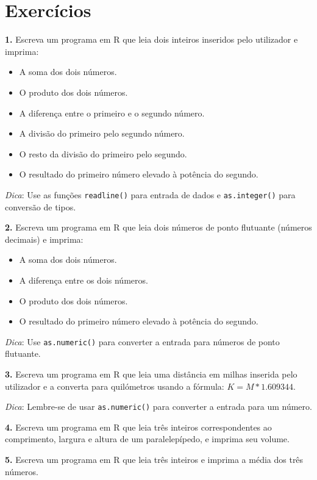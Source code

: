 \documentclass[
]{book}
\providecommand{\tightlist}{%
  \setlength{\itemsep}{0pt}\setlength{\parskip}{0pt}}
\begin{document}
\section{Exercícios}\label{exercuxedcios}

\textbf{1.} Escreva um programa em R que leia dois inteiros inseridos pelo
utilizador e imprima:

\begin{itemize}
\tightlist
\item
  A soma dos dois números.
\item
  O produto dos dois números.
\item
  A diferença entre o primeiro e o segundo número.
\item
  A divisão do primeiro pelo segundo número.
\item
  O resto da divisão do primeiro pelo segundo.
\item
  O resultado do primeiro número elevado à potência do segundo.
\end{itemize}

\emph{Dica}: Use as funções \texttt{readline()} para entrada de dados e
\texttt{as.integer()} para conversão de tipos.

\textbf{2.} Escreva um programa em R que leia dois números de ponto flutuante
(números decimais) e imprima:

\begin{itemize}
\tightlist
\item
  A soma dos dois números.
\item
  A diferença entre os dois números.
\item
  O produto dos dois números.
\item
  O resultado do primeiro número elevado à potência do segundo.
\end{itemize}

\emph{Dica}: Use \texttt{as.numeric()} para converter a entrada para números de
ponto flutuante.

\textbf{3.} Escreva um programa em R que leia uma distância em milhas
inserida pelo utilizador e a converta para quilómetros usando a fórmula:
\(K = M*1.609344\).

\emph{Dica}: Lembre-se de usar \texttt{as.numeric()} para converter a entrada para
um número.

\textbf{4.} Escreva um programa em R que leia três inteiros correspondentes
ao comprimento, largura e altura de um paralelepípedo, e imprima seu
volume.

\textbf{5.} Escreva um programa em R que leia três inteiros e imprima a média
dos três números.
\end{document}
